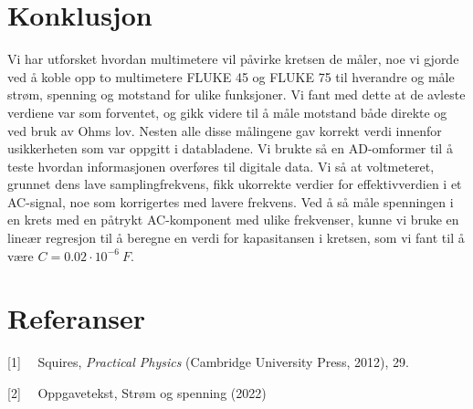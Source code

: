 \documentclass[norsk,a4paper,12pt]{article}
\begin{document}
\section{Konklusjon}

Vi har utforsket hvordan multimetere vil påvirke kretsen de måler, noe vi gjorde ved å koble opp to multimetere FLUKE 45 og FLUKE 75 til hverandre og måle strøm, spenning og motstand for ulike funksjoner. Vi fant med dette at de avleste verdiene var som forventet, og gikk videre til å måle motstand både direkte og ved bruk av Ohms lov. Nesten alle disse målingene gav korrekt verdi innenfor usikkerheten som var oppgitt i databladene.
Vi brukte så en AD-omformer til å teste hvordan informasjonen overføres til digitale data. Vi så at voltmeteret, grunnet dens lave samplingfrekvens, fikk ukorrekte verdier for effektivverdien i et AC-signal, noe som korrigertes med lavere frekvens. Ved å så måle spenningen i en krets med en påtrykt AC-komponent med ulike frekvenser, kunne vi bruke en lineær regresjon til å beregne en verdi for kapasitansen i kretsen, som vi fant til å være $C =0.02 \cdot 10^{-6} \ F$. 


\section{Referanser}
[1] \ \ Squires, \textit{Practical Physics} (Cambridge University Press, 2012), 29.

[2] \ \ Oppgavetekst, Strøm og spenning (2022)\\
\end{document}

